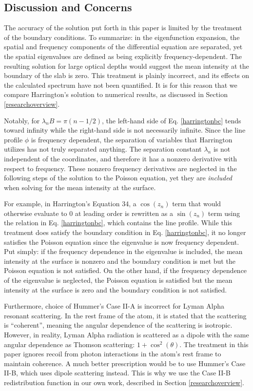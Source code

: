 \documentclass[onecolumn]{aastex63}
\begin{document}
\subsection{Discussion and Concerns} \label{concerns}

The accuracy of the solution put forth in this paper is limited by the treatment of the boundary conditions. To summarize: in the eigenfunction expansion, the spatial and frequency components of the differential equation are separated, yet the spatial eigenvalues are defined as being explicitly frequency-dependent. The resulting solution for large optical depths would suggest the mean intensity at the boundary of the slab is zero. This treatment is plainly incorrect, and its effects on the calculated spectrum have not been quantified. It is for this reason that we compare Harrington's solution to numerical results, as discussed in Section \ref{researchoverview}. 

Notably, for $\lambda_n B = \pi(n-1/2)$, the left-hand side of Eq. \ref{harringtonbc} tends toward infinity while the right-hand side is not necessarily infinite. Since the line profile $\phi$ is frequency dependent, the separation of variables that Harrington utilizes has not truly separated anything. The separation constant $\lambda_n$ is not independent of the coordinates, and therefore it has a nonzero derivative with respect to frequency. These nonzero frequency derivatives are neglected in the following steps of the solution to the Poisson equation, yet they are \textit{included} when solving for the mean intensity at the surface.

For example, in Harrington's Equation 34, a $\cos(z_n)$ term that would otherwise evaluate to 0 at leading order is rewritten as a $\sin(z_n)$ term using the relation in Eq. \ref{harringtonbc}, which contains the line profile. While this treatment does satisfy the boundary condition in Eq. \ref{harringtonbc}, it no longer satisfies the Poisson equation since the eigenvalue is now frequency dependent. Put simply: if the frequency dependence in the eigenvalue is included, the mean intensity at the surface is nonzero and the boundary condition is met but the Poisson equation is not satisfied. On the other hand, if the frequency dependence of the eigenvalue is neglected, the Poisson equation is satisfied but the mean intensity at the surface is zero and the boundary condition is not satisfied.

Furthermore, choice of Hummer's Case II-A is incorrect for Lyman Alpha resonant scattering. In the rest frame of the atom, it is stated that the scattering is ``coherent'', meaning the angular dependence of the scattering is isotropic. However, in reality, Lyman Alpha radiation is scattered as a dipole with the same angular dependence as Thomson scattering: $1+\cos^2(\theta)$. The treatment in this paper ignores recoil from photon interactions in the atom's rest frame to maintain coherence. A much better prescription would be to use Hummer's Case II-B, which uses dipole scattering instead. This is why we use the Case II-B redistribution function in our own work, described in Section \ref{researchoverview}.
\end{document}
